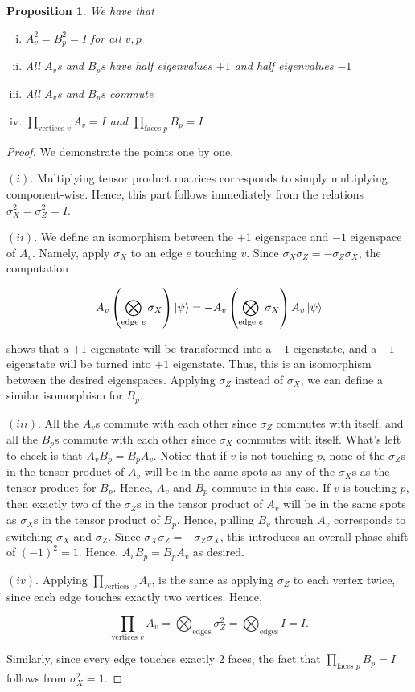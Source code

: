 \documentclass{article}
\newtheorem{proposition}{Proposition}[section]
\theoremstyle{definition}
\numberwithin{figure}{section}
\begin{document}
\begin{proposition}\label{AvBp}We have that

\begin{enumerate}[(i)]
\item $A_v^2=B_p^2=I$ for all $v,p$
\item All $A_v$s and $B_p$s have half eigenvalues $+1$ and half eigenvalues $-1$
\item All $A_v$s and $B_p$s commute
\item $\prod_{\text{vertices }v}A_v=I$ and $\prod_{\text{faces }p}B_p=I$
\end{enumerate}

\end{proposition}
\begin{proof} We demonstrate the points one by one.

$(i).$ Multiplying tensor product matrices corresponds to simply multiplying component-wise. Hence, this part  follows immediately from the relations $\sigma_X^2=\sigma_Z^2=I$.

$(ii).$ We define an isomorphism between the $+1$ eigenspace and $-1$ eigenspace of $A_v$. Namely, apply $\sigma_X$ to an edge $e$ touching $v$. Since $\sigma_X\sigma_Z=-\sigma_Z\sigma_X$, the computation

$$A_v \left(\bigotimes_{\text{edge }e}\sigma_X\right)\left|\psi\right> = -A_v \left(\bigotimes_{\text{edge }e}\sigma_X\right)A_v\left|\psi\right> $$

shows that a $+1$ eigenstate will be transformed into a $-1$ eigenstate, and a $-1$ eigenstate will be turned into $+1$ eigenstate. Thus, this is an isomorphism between the desired eigenspaces. Applying $\sigma_Z$ instead of $\sigma_X$, we can define a similar isomorphism for $B_p$.

$(iii).$ All the $A_v$s commute with each other since $\sigma_Z$ commutes with itself, and all the $B_p$s commute with each other since $\sigma_X$ commutes with itself. What's left to check is that $A_vB_p=B_pA_v$. Notice that if $v$ is not touching $p$, none of the $\sigma_Z$s in the tensor product of $A_v$ will be in the same spots as any of the $\sigma_X$s as the tensor product for $B_p$. Hence, $A_v$ and $B_p$ commute in this case. If $v$ is touching $p$, then exactly two of the $\sigma_Z$s in the tensor product of $A_v$ will be in the same spots as $\sigma_X$s in the tensor product of $B_p$. Hence, pulling $B_v$ through $A_v$ corresponds to switching $\sigma_X$ and $\sigma_Z$. Since $\sigma_X\sigma_Z=-\sigma_Z\sigma_X$, this introduces an overall phase shift of $(-1)^2=1$. Hence, $A_vB_p=B_pA_v$ as desired.

$(iv).$ Applying $\prod_{\text{vertices } v}A_v$, is the same as applying $\sigma_Z$ to each vertex twice, since each edge touches exactly two vertices. Hence,

$$\prod_{\text{vertices } v}A_v=\bigotimes_{\text{edges}}\sigma^2_Z=\bigotimes_{\text{edges}}I=I.$$

Similarly, since every edge touches exactly $2$ faces, the fact that $\prod_{\text{faces } p}B_p=I$ follows from $\sigma^2_X=1$.
\end{proof}
\end{document}
